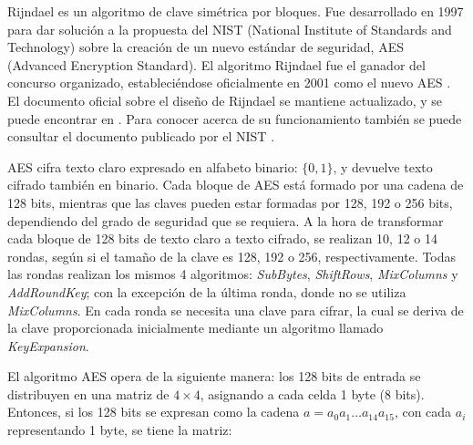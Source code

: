 Rijndael es un algoritmo de clave simétrica por bloques. Fue desarrollado en 1997 para dar solución a la propuesta del NIST (National Institute of Standards and Technology) sobre la creación de un nuevo estándar de seguridad, AES (Advanced Encryption Standard). El algoritmo Rijndael fue el ganador del concurso organizado, estableciéndose oficialmente en 2001 como el nuevo AES \cite{fips197up}. El documento oficial sobre el diseño de Rijndael se mantiene actualizado, y se puede encontrar en \cite{Rijndael}. Para conocer acerca de su funcionamiento también se puede consultar el documento publicado por el NIST \cite{fips197up}.

AES cifra texto claro expresado en alfabeto binario: $\{0,1\}$, y devuelve texto cifrado también en binario. Cada bloque de AES está formado por una cadena de 128 bits, mientras que las claves pueden estar formadas por 128, 192 o 256 bits, dependiendo del grado de seguridad que se requiera. A la hora de transformar cada bloque de 128 bits de texto claro a texto cifrado, se realizan 10, 12 o 14 rondas, según si el tamaño de la clave es 128, 192 o 256, respectivamente. Todas las rondas realizan los mismos 4 algoritmos: \mbox{\textit{SubBytes}}, \mbox{\textit{ShiftRows}}, \mbox{\textit{MixColumns}} y \mbox{\textit{AddRoundKey}}; con la excepción de la última ronda, donde no se utiliza \mbox{\textit{MixColumns}}. En cada ronda se necesita una clave para cifrar, la cual se deriva de la clave proporcionada inicialmente mediante un algoritmo llamado \mbox{\textit{KeyExpansion}}.

El algoritmo AES opera de la siguiente manera: los 128 bits de entrada se distribuyen en una matriz de $4 \times 4$, asignando a cada celda 1 byte (8 bits). Entonces, si los 128 bits se expresan como la cadena $a = a_0a_1\ldots a_{14}a_{15}$, con cada $a_i$ representando 1 byte, se tiene la matriz:
\begin{center}
\end{center}


